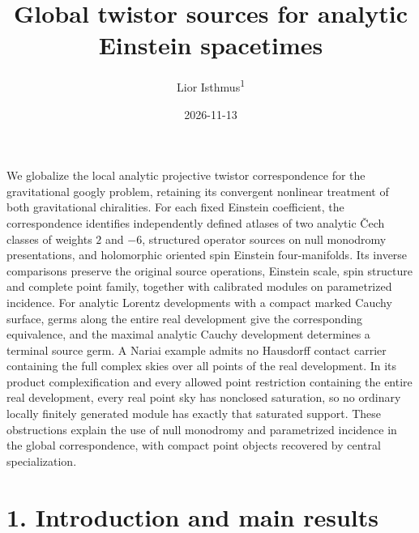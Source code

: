 \documentclass[
  english,
  11pt,
  reqno]{amsart}
\title{Global twistor sources for analytic Einstein spacetimes}
\author{Lior Isthmus\textsuperscript{1}}
\date{2026-11-13}
\newcommand{\pandocabstractheading}{%
  \par\begingroup
    \normalsize\section*{\abstractname}%
  \endgroup
  \nobreak\noindent\ignorespaces
}
\begin{document}
\maketitle


\protect{}\label{sec:title}

\label{global-twistor-sources-for-analytic-einstein-spacetimes}

\protect{}\label{sec:abstract}

\pandocabstractheading\label{abstract}

We globalize the local analytic projective twistor correspondence for
the gravitational googly problem, retaining its convergent nonlinear
treatment of both gravitational chiralities. For each fixed Einstein
coefficient, the correspondence identifies independently defined atlases
of two analytic Čech classes of weights \(2\) and \(-6\), structured
operator sources on null monodromy presentations, and holomorphic
oriented spin Einstein four-manifolds. Its inverse comparisons preserve
the original source operations, Einstein scale, spin structure and
complete point family, together with calibrated modules on parametrized
incidence. For analytic Lorentz developments with a compact marked
Cauchy surface, germs along the entire real development give the
corresponding equivalence, and the maximal analytic Cauchy development
determines a terminal source germ. A Nariai example admits no Hausdorff
contact carrier containing the full complex skies over all points of the
real development. In its product complexification and every allowed
point restriction containing the entire real development, every real
point sky has nonclosed saturation, so no ordinary locally finitely
generated module has exactly that saturated support. These obstructions
explain the use of null monodromy and parametrized incidence in the
global correspondence, with compact point objects recovered by central
specialization.

\setcounter{footnote}{1}

\clearpage
\tableofcontents

\protect{}\label{sec:introduction}

\section{1. Introduction and main
results}\label{introduction-and-main-results}
\end{document}
